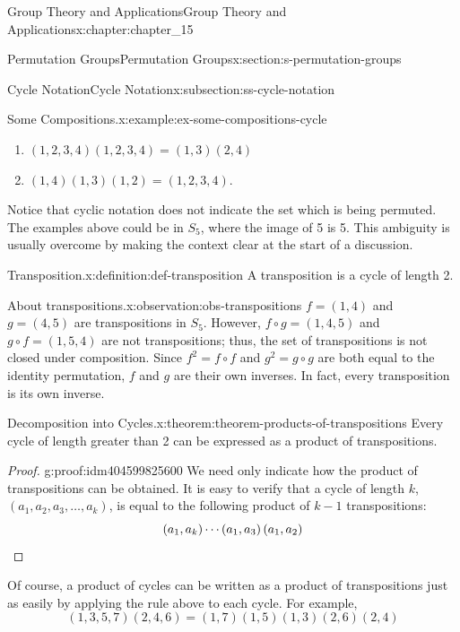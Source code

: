 \documentclass[twoside,10pt,]{book}
\newcommand{\qedhere}{\relax}
\numberwithin{equation}{section}
\begin{document}
\begin{chapterptx}{Group Theory and Applications}{}{Group Theory and Applications}{}{}{x:chapter:chapter_15}
\begin{sectionptx}{Permutation Groups}{}{Permutation Groups}{}{}{x:section:s-permutation-groups}
\begin{subsectionptx}{Cycle Notation}{}{Cycle Notation}{}{}{x:subsection:ss-cycle-notation}
\begin{example}{Some Compositions.}{x:example:ex-some-compositions-cycle}%
%
\begin{enumerate}[label=(\alph*)]
\item{}\((1, 2, 3, 4)(1, 2, 3, 4) = (1, 3)(2, 4)\)%
\item{}\((1, 4)(1, 3)(1, 2) = (1, 2, 3, 4)\).%
\end{enumerate}
Notice that cyclic notation does not indicate the set which is being permuted. The examples above could be in \(S_5\), where the image of 5 is 5. This ambiguity is usually overcome by making the context clear at the start of a discussion.%
\end{example}
\begin{definition}{Transposition.}{x:definition:def-transposition}%
%
A transposition is a cycle of length 2.%
\end{definition}
\begin{observation}{About transpositions.}{x:observation:obs-transpositions}%
\(f= (1, 4)\) and \(g=(4,5)\) are transpositions in \(S_5\).  However, \(f\circ g = (1,4, 5)\) and \(g \circ f = (1, 5, 4)\) are not transpositions; thus, the set of transpositions is not closed under composition. Since \(f^2=f\circ f\) and \(g^2=g\circ
g\) are both equal to the identity permutation,  \(f\) and \(g\) are their own inverses. In fact, every transposition is its own inverse.%
\end{observation}
\begin{theorem}{Decomposition into Cycles.}{}{x:theorem:theorem-products-of-transpositions}%
Every cycle of length greater than 2 can be expressed as a product of transpositions.%
\end{theorem}
\begin{proof}{}{g:proof:idm404599825600}
We need only indicate how the product of transpositions can be obtained. It is easy to verify that a cycle of length \(k\), \(\left(a_1, a_2, a_3, \ldots , a_k\right)\), is equal to the following product of \(k-1\) transpositions:%
\begin{equation*}
\left(a_1, a_k\right) \cdots \left(a_1,a_3\right)\left(a_1,a_2\right)\qedhere
\end{equation*}
%
\end{proof}
Of course, a product of cycles can be written as a product of transpositions just as easily by applying the rule above to each cycle. For example,%
\begin{equation*}
(1, 3, 5, 7)(2, 4, 6) = (1, 7)(1, 5)(1, 3)(2, 6)(2, 4)

\end{equation*}
\end{subsectionptx}
\end{sectionptx}
\end{chapterptx}
\end{document}

